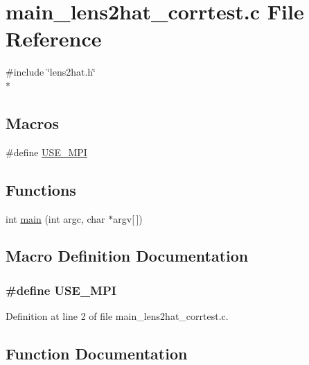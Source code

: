 \section{main\-\_\-lens2hat\-\_\-corrtest.\-c File Reference}
\label{main__lens2hat__corrtest_8c}
{\ttfamily \#include \char`\"{}lens2hat.\-h\char`\"{}}\\*
\subsection*{Macros}
\begin{DoxyCompactItemize}
\item 
\#define \hyperlink{main__lens2hat__corrtest_8c_a3869d282031f6ea6b50fdb980b758420}{U\-S\-E\-\_\-\-M\-P\-I}
\end{DoxyCompactItemize}
\subsection*{Functions}
\begin{DoxyCompactItemize}
\item 
int \hyperlink{main__lens2hat__corrtest_8c_a0ddf1224851353fc92bfbff6f499fa97}{main} (int argc, char $\ast$argv\mbox{[}$\,$\mbox{]})
\end{DoxyCompactItemize}


\subsection{Macro Definition Documentation}
\subsubsection[{U\-S\-E\-\_\-\-M\-P\-I}]{\setlength{\rightskip}{0pt plus 5cm}\#define U\-S\-E\-\_\-\-M\-P\-I}\label{main__lens2hat__corrtest_8c_a3869d282031f6ea6b50fdb980b758420}


Definition at line 2 of file main\-\_\-lens2hat\-\_\-corrtest.\-c.



\subsection{Function Documentation}
